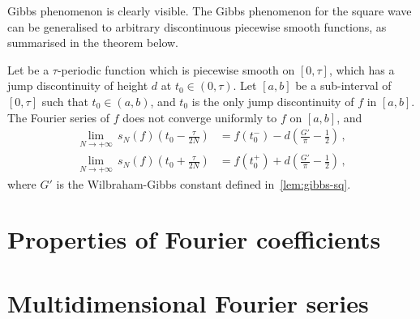 Gibbs phenomenon is clearly visible. The Gibbs phenomenon for the square wave can be
generalised to arbitrary discontinuous piecewise smooth functions, as summarised in the
theorem below.
\begin{theorem}
  Let be a $\tau$-periodic function which is piecewise smooth on $[0,\tau]$, which has a
  jump discontinuity of height $d$ at $t_0\in(0,\tau)$. Let $[a,b]$ be a sub-interval of
  $[0,\tau]$ such that $t_0\in(a,b)$, and $t_0$ is the only jump discontinuity of $f$ in
  $[a,b]$. The Fourier series of $f$ does not converge uniformly to $f$ on $[a,b]$, and
  \begin{align}
    \lim_{N\to+\infty}\,s_N(f)\left(t_0-\frac{\tau}{2N}\right)
    &=f(t_0^-)-d\left(\frac{G'}{\pi}-\frac12\right)\,,\\
    \lim_{N\to+\infty}\,s_N(f)\left(t_0+\frac{\tau}{2N}\right)
    &=f(t_0^+)+d\left(\frac{G'}{\pi}-\frac12\right)\,,
  \end{align}
  where $G'$ is the Wilbraham-Gibbs constant defined in~\cref{lem:gibbs-sq}.
\end{theorem}
\section{Properties of Fourier coefficients}
\section{Multidimensional Fourier series}
